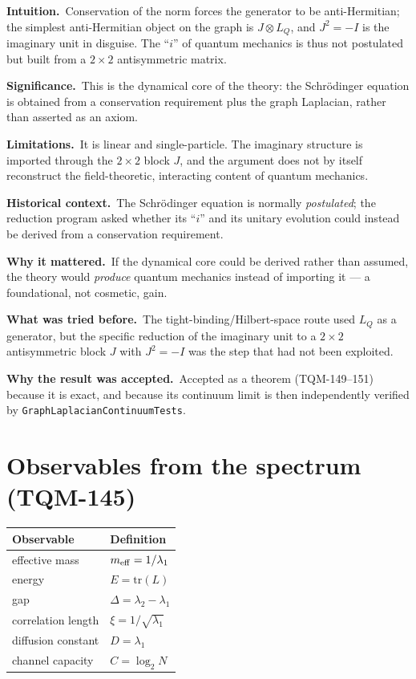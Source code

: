 \documentclass[10pt,twoside,openany]{book}
\newcommand{\theoremnotes}[3]{%
  \par\medskip\noindent
  \textbf{Intuition.}\ #1\par
  \textbf{Significance.}\ #2\par
  \textbf{Limitations.}\ #3\par}
\newcommand{\historynotes}[4]{%
  \par\smallskip\noindent
  \textbf{Historical context.}\ #1\par
  \textbf{Why it mattered.}\ #2\par
  \textbf{What was tried before.}\ #3\par
  \textbf{Why the result was accepted.}\ #4\par}
\begin{document}
\theoremnotes
{Conservation of the norm forces the generator to be anti-Hermitian; the simplest
anti-Hermitian object on the graph is $J\otimes L_Q$, and $J^2=-I$ is the imaginary unit
in disguise. The ``$i$'' of quantum mechanics is thus not postulated but built from a
$2\times2$ antisymmetric matrix.}
{This is the dynamical core of the theory: the Schr\"odinger equation is obtained from a
conservation requirement plus the graph Laplacian, rather than asserted as an axiom.}
{It is linear and single-particle. The imaginary structure is imported through the
$2\times2$ block $J$, and the argument does not by itself reconstruct the
field-theoretic, interacting content of quantum mechanics.}

\historynotes
{The Schr\"odinger equation is normally \emph{postulated}; the reduction program asked
whether its ``$i$'' and its unitary evolution could instead be derived from a conservation
requirement.}
{If the dynamical core could be derived rather than assumed, the theory would \emph{produce}
quantum mechanics instead of importing it --- a foundational, not cosmetic, gain.}
{The tight-binding/Hilbert-space route used $L_Q$ as a generator, but the specific reduction
of the imaginary unit to a $2\times2$ antisymmetric block $J$ with $J^2=-I$ was the step
that had not been exploited.}
{Accepted as a theorem (TQM-149--151) because it is exact, and because its continuum limit
is then independently verified by \texttt{GraphLaplacianContinuumTests}.}

\section{Observables from the spectrum (TQM-145)}

\begin{center}
\begin{tabular}{ll}
\toprule
Observable & Definition \\
\midrule
effective mass & $m_{\rm eff} = 1/\lambda_1$ \\
energy & $E = \mathrm{tr}(L)$ \\
gap & $\Delta = \lambda_2-\lambda_1$ \\
correlation length & $\xi = 1/\sqrt{\lambda_1}$ \\
diffusion constant & $D = \lambda_1$ \\
channel capacity & $C = \log_2 N$ \\
\bottomrule
\end{tabular}
\end{center}
\end{document}
